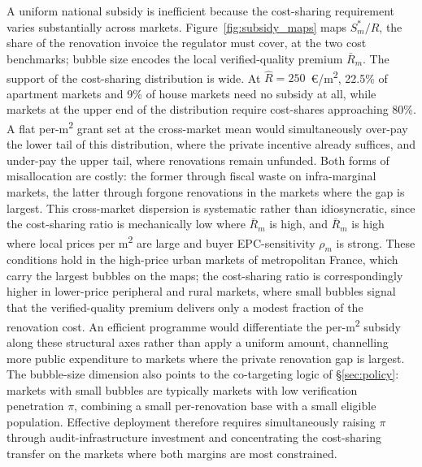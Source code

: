\documentclass[10pt,letterpaper]{bp-template-concise}
\begin{document}
A uniform national subsidy is inefficient because the cost-sharing requirement varies substantially across markets. Figure~\ref{fig:subsidy_maps} maps $S^*_m / \hat{R}$, the share of the renovation invoice the regulator must cover, at the two cost benchmarks; bubble size encodes the local verified-quality premium $\bar{R}_m$. The support of the cost-sharing distribution is wide. At $\hat{R} = 250$~\euro{}/m\textsuperscript{2}, 22.5\% of apartment markets and 9\% of house markets need no subsidy at all, while markets at the upper end of the distribution require cost-shares approaching 80\%. A flat per-m\textsuperscript{2} grant set at the cross-market mean would simultaneously over-pay the lower tail of this distribution, where the private incentive already suffices, and under-pay the upper tail, where renovations remain unfunded. Both forms of misallocation are costly: the former through fiscal waste on infra-marginal markets, the latter through forgone renovations in the markets where the gap is largest. This cross-market dispersion is systematic rather than idiosyncratic, since the cost-sharing ratio is mechanically low where $\bar{R}_m$ is high, and $\bar{R}_m$ is high where local prices per m\textsuperscript{2} are large and buyer EPC-sensitivity $\rho_m$ is strong. These conditions hold in the high-price urban markets of metropolitan France, which carry the largest bubbles on the maps; the cost-sharing ratio is correspondingly higher in lower-price peripheral and rural markets, where small bubbles signal that the verified-quality premium delivers only a modest fraction of the renovation cost. An efficient programme would differentiate the per-m\textsuperscript{2} subsidy along these structural axes rather than apply a uniform amount, channelling more public expenditure to markets where the private renovation gap is largest. The bubble-size dimension also points to the co-targeting logic of \S\ref{sec:policy}: markets with small bubbles are typically markets with low verification penetration $\pi$, combining a small per-renovation base with a small eligible population. Effective deployment therefore requires simultaneously raising $\pi$ through audit-infrastructure investment and concentrating the cost-sharing transfer on the markets where both margins are most constrained.
\end{document}
